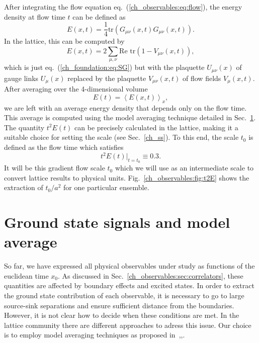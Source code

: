 After integrating the flow equation eq.~(\ref{ch_observables:eq:flow}), the energy density at flow time $t$ can be defined as
\begin{equation}
E(x,t)=\frac{1}{4}{\textrm{tr}}\left({G}_{\mu\nu}(x,t){G}_{\mu\nu}(x,t)\right).
\end{equation}
In the lattice, this can be computed by
\begin{equation}
E(x,t)=2\sum_{\mu,\nu}\textrm{Re tr}\left(1-V_{\mu\nu}(x,t)\right),
\end{equation}
which is just eq.~(\ref{ch_foundation:eq:SG}) but with the plaquette $U_{\mu\nu}(x)$ of gauge links $U_{\mu}(x)$ replaced by the plaquette $V_{\mu\nu}(x,t)$ of flow fields $V_{\mu}(x,t)$. After averaging over the 4-dimensional volume
\begin{equation}
E(t)=\left<E(x,t)\right>_x,
\end{equation}
we are left with an average energy density that depends only on the flow time. This average is computed using the model averaging technique detailed in Sec.~\ref{ch_observables:sec:MA}. The quantity $t^2E(t)$ can be precisely calculated in the lattice, making it a suitable choice for setting the scale (see Sec.~\ref{ch_ss}). To this end, the scale $t_0$ is defined as the flow time which satisfies
\begin{equation}
\label{ch_observables:eq:t0}
t^2E(t)|_{t=t_0}\equiv0.3.
\end{equation}
It will be this gradient flow scale $t_0$ which we will use as an intermediate scale to convert lattice results to physical units. Fig.~\ref{ch_observables:fig:t2E} shows the extraction of $t_0/a^2$ for one particular ensemble.



\section{Ground state signals and model average}
\label{ch_observables:sec:MA}

So far, we have expressed all physical observables under study as functions of the euclidean time $x_0$. As discussed in Sec.~\ref{ch_observables:sec:correlators}, these quantities are affected by boundary effects and excited states. In order to extract the ground state contribution of each observable, it is necessary to go to large source-sink separations and ensure sufficient distance from the boundaries. However, it is not clear how to decide when these conditions are met. In the lattice community there are different approaches to adress this issue. Our choice is to employ model averaging techniques as proposed in~\citep{Neil:2022joj},\citep{Neil:2023pgt},\citep{Frison:2023jbv}.

